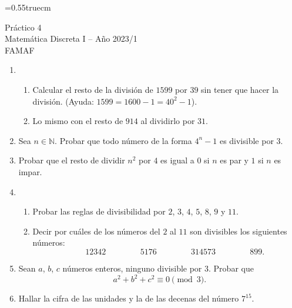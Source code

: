 \documentclass[a4paper,12pt,twoside,spanish,reqno]{amsbook}
\numberwithin{equation}{section}
\begin{document}
    \baselineskip=0.55truecm %
    


{\bf \begin{center}\large Práctico 4 \\ Matemática Discreta I -- Año 2023/1 \\ FAMAF \end{center}}



\begin{enumerate}
\setlength\itemsep{1.1em}

\item  
    \begin{enumerate}
        \item Calcular el resto de la división de $1599$ por $39$ sin tener que hacer la división. (Ayuda: $1599=1600-1=40^2-1$).
        \item Lo mismo con el resto de $914$ al dividirlo por $31$.
    \end{enumerate}


\item Sea $n\in\mathbb N$. Probar que todo número de la forma $4^n-1$ es divisible por $3$.


\item Probar que el resto de dividir $n^2$ por $4$ es igual a $0$ si $n$ es par y $1$ si $n$ es impar.


\item
    \begin{enumerate}
    \item Probar las reglas de divisibilidad por $2$, $3$, $4$, $5$, $8$, $9$ y $11$.
    \item Decir por cuáles de los números del $2$ al $11$ son divisibles los siguientes números:
    \begin{equation*}
            \qquad 12342  \, \qquad   \qquad  5176 \, \qquad \qquad  314573\,  \qquad  \qquad  899.
        \end{equation*}
    \end{enumerate}


\item Sean $a$, $b$, $c$ números enteros, ninguno divisible por $3$. Probar que 
    \begin{equation*}
        a^2 + b^2 + c^2\equiv 0 \pmod 3.
    \end{equation*}


\item Hallar la cifra de las unidades y la de las decenas del número $7^{15}$.



\end{enumerate}
\end{document}
